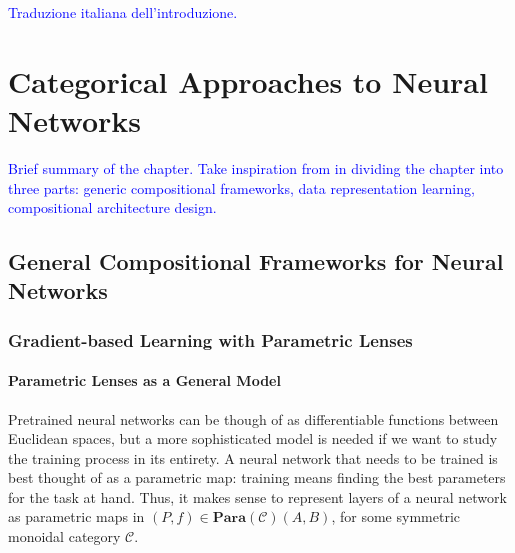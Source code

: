 \documentclass[11pt,a4paper,openright,twoside]{report}
\theoremstyle{plain}
\theoremstyle{definition}
\begin{document}
  \textcolor{blue}{Traduzione italiana dell'introduzione.}


\clearpage{\pagestyle{empty}\cleardoublepage}



\tableofcontents
\rhead[\fancyplain{}{\bfseries\leftmark}]{\fancyplain{}{\bfseries\thepage}} 
\clearpage{\pagestyle{empty}\cleardoublepage}




\chapter{Categorical Approaches to Neural Networks}
\lhead[\fancyplain{}{\bfseries\thepage}]{\fancyplain{}{\bfseries\rightmark}}




\textcolor{blue}{Brief summary of the chapter. Take inspiration from \cite{abbottCategoryTheoryArtificial2024} in dividing the chapter into three parts: generic compositional frameworks, data representation learning, compositional architecture design.}




\section{General Compositional Frameworks for Neural Networks}



\subsection{Gradient-based Learning with Parametric Lenses}

\subsubsection{Parametric Lenses as a General Model}

Pretrained neural networks can be though of as differentiable functions between Euclidean spaces, but a more sophisticated model is needed if we want to study the training process in its entirety. A neural network that needs to be trained is best thought of as a parametric map: training means finding the best parameters for the task at hand. Thus, it makes sense to represent layers of a neural network as parametric maps in $(P,f) \in \mathbf{Para}(\mathcal{C})(A,B)$, for some symmetric monoidal category $\mathcal{C}$.
\end{document}
